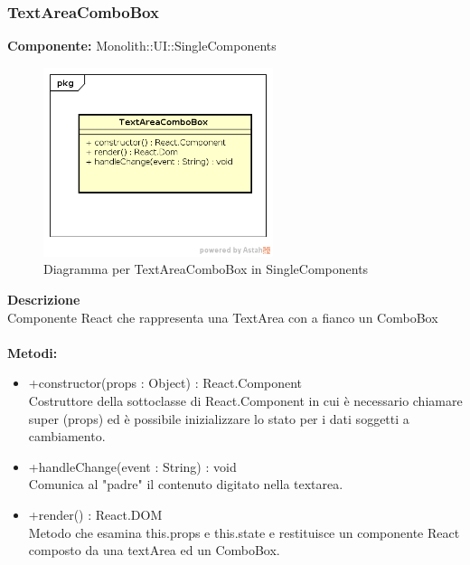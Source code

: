 \subsubsection{TextAreaComboBox}
\textbf{Componente:}  Monolith::UI::SingleComponents\\
   \FloatBarrier
   \begin{figure}[ht]
   \centering
   \includegraphics[width=0.6\textwidth]{img/single-TextAreaComboBox.png}
   \caption{{Diagramma per TextAreaComboBox in SingleComponents}}
\end{figure}
\FloatBarrier
\textbf{Descrizione}\\
Componente React che rappresenta una TextArea con a fianco un ComboBox \\\\
\textbf{Metodi:} 
\begin{itemize}

\item +constructor(props : Object) : React.Component 
\\
Costruttore della sottoclasse di React.Component in cui è necessario chiamare super (props) ed è possibile inizializzare lo stato per i dati soggetti a cambiamento.

\item +handleChange(event : String) : void  
\\ 
Comunica al "padre" il contenuto digitato nella textarea.

\item +render() : React.DOM 
\\
Metodo che esamina this.props e this.state e restituisce un componente React composto da una textArea ed un ComboBox.

\end{itemize}

